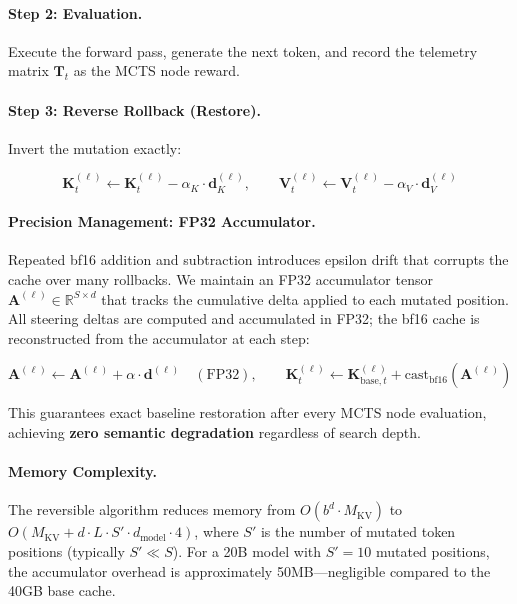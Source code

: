 \documentclass[10pt]{article}
\begin{document}
\paragraph{Step 2: Evaluation.} Execute the forward pass, generate the next token, and record the telemetry matrix $\mathbf{T}_t$ as the MCTS node reward.

\paragraph{Step 3: Reverse Rollback (Restore).} Invert the mutation exactly:

\begin{equation}
\mathbf{K}_t^{(\ell)} \leftarrow \mathbf{K}_t^{(\ell)} - \alpha_K \cdot \mathbf{d}_K^{(\ell)}, \qquad \mathbf{V}_t^{(\ell)} \leftarrow \mathbf{V}_t^{(\ell)} - \alpha_V \cdot \mathbf{d}_V^{(\ell)}
\label{eq:reverse_rollback}
\end{equation}

\paragraph{Precision Management: FP32 Accumulator.} Repeated bf16 addition and subtraction introduces epsilon drift that corrupts the cache over many rollbacks. We maintain an FP32 accumulator tensor $\mathbf{A}^{(\ell)} \in \mathbb{R}^{S \times d}$ that tracks the cumulative delta applied to each mutated position. All steering deltas are computed and accumulated in FP32; the bf16 cache is reconstructed from the accumulator at each step:

\begin{equation}
\mathbf{A}^{(\ell)} \leftarrow \mathbf{A}^{(\ell)} + \alpha \cdot \mathbf{d}^{(\ell)} \quad (\text{FP32}), \qquad \mathbf{K}_t^{(\ell)} \leftarrow \mathbf{K}_{\text{base},t}^{(\ell)} + \text{cast}_{\text{bf16}}(\mathbf{A}^{(\ell)})
\label{eq:fp32_accumulator}
\end{equation}

This guarantees exact baseline restoration after every MCTS node evaluation, achieving \textbf{zero semantic degradation} regardless of search depth.

\paragraph{Memory Complexity.} The reversible algorithm reduces memory from $O(b^d \cdot M_{\text{KV}})$ to $O(M_{\text{KV}} + d \cdot L \cdot S' \cdot d_{\text{model}} \cdot 4)$, where $S'$ is the number of mutated token positions (typically $S' \ll S$). For a 20B model with $S' = 10$ mutated positions, the accumulator overhead is approximately 50MB---negligible compared to the 40GB base cache.
\end{document}
